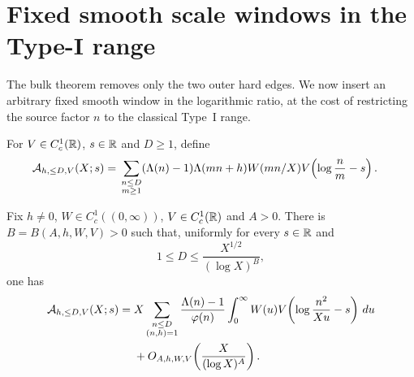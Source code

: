 \section{Fixed smooth scale windows in the Type-I range}
\label{sec:type-i-localization}

The bulk theorem removes only the two outer hard edges.  We now insert an
arbitrary fixed smooth window in the logarithmic ratio, at the cost of restricting
the source factor $n$ to the classical Type~I range.

For $V\in C_c^1(\mathbb R)$, $s\in\mathbb R$ and $D\geq1$, define
\begin{align}
 \mathcal A_{h,\leq D,V}(X;s)
 ={}&\sum_{\substack{n\leq D\\m\geq1}}
 (\Lambda(n)-1)\Lambda(mn+h)W(mn/X)
 V\!\left(\log\frac{n}{m}-s\right).
 \label{eq:Type-I-localized-definition}
\end{align}

\begin{theorem}
\label{thm:Type-I-scale-localization}
Fix $h\ne0$, $W\in C_c^1((0,\infty))$, $V\in C_c^1(\mathbb R)$ and $A>0$.
There is $B=B(A,h,W,V)>0$ such that, uniformly for every $s\in\mathbb R$ and
\begin{equation}\label{eq:Type-I-D-range}
 1\leq D\leq \frac{X^{1/2}}{(\log X)^B},
\end{equation}
one has
\begin{align}
 \mathcal A_{h,\leq D,V}(X;s)
 ={}&X\sum_{\substack{n\leq D\\(n,h)=1}}
 \frac{\Lambda(n)-1}{\varphi(n)}
 \int_0^\infty W(u)
 V\!\left(\log\frac{n^2}{Xu}-s\right)\,du
\notag\\
 &+O_{A,h,W,V}\!\left(\frac{X}{(\log X)^A}\right).
 \label{eq:Type-I-localized-asymptotic}
\end{align}
\end{theorem}

